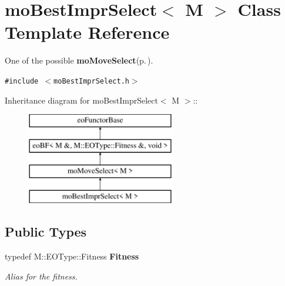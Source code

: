 \section{mo\-Best\-Impr\-Select$<$ M $>$ Class Template Reference}
\label{classmo_best_impr_select}
One of the possible {\bf mo\-Move\-Select}{\rm (p.\,\pageref{classmo_move_select})}.  


{\tt \#include $<$mo\-Best\-Impr\-Select.h$>$}

Inheritance diagram for mo\-Best\-Impr\-Select$<$ M $>$::\begin{figure}[H]
\begin{center}
\leavevmode
\includegraphics[height=4cm]{classmo_best_impr_select}
\end{center}
\end{figure}
\subsection*{Public Types}
\begin{CompactItemize}
\item 
typedef M::EOType::Fitness {\bf Fitness}\label{classmo_best_impr_select_w0}

\begin{CompactList}\small\item\em Alias for the fitness. \item\end{CompactList}\end{CompactItemize}
